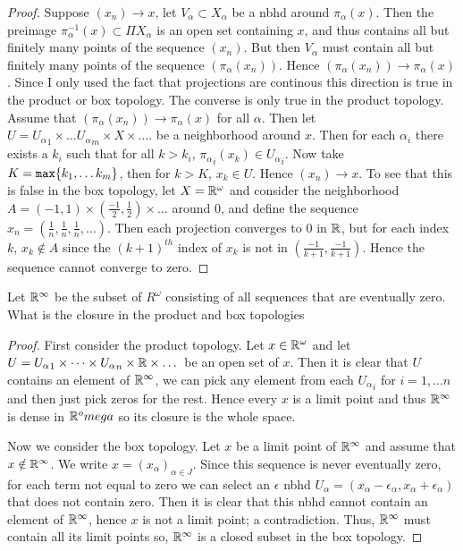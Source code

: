     \begin{proof}
        Suppose $(x_n) \rightarrow x$, let $V_\alpha \subset X_\alpha$ be a nbhd around $\pi_\alpha(x)$. Then the preimage $\pi_\alpha^{-1}(x) \subset \Pi X_\alpha$ is an open set containing $x$, and thus contains all but finitely many points 
        of the sequence $(x_n)$. But then $V_\alpha$ must contain all but finitely many points of the sequence $(\pi_\alpha(x_n))$. Hence $(\pi_\alpha(x_n)) \rightarrow \pi_\alpha(x)$. Since I only used the fact that projections are continous 
        this direction is true in the product or box topology. The converse is only true in the product topology. Assume that $(\pi_\alpha(x_n)) \rightarrow \pi_\alpha(x)$ for all $\alpha$. Then let $U = {U_\alpha}_1 \times \dots {U_\alpha}_m \times X \times \dots$. 
        be a neighborhood around $x$. Then for each $\alpha_i$ there exists a $k_i$ such that for all $k > k_i$, ${\pi_\alpha}_i(x_k) \in {U_\alpha}_i$. Now take $K = {\tt max}\{k_1, \dots k_m\}$, then for $k > K$, 
        $x_k \in U$. Hence $(x_n) \rightarrow x$. To see that this is false in the box topology, let $X = \mathbb{R}^\omega$ and consider the neighborhood $A = (-1, 1) \times (\frac{-1}{2}, \frac{1}{2}) \times \dots$ around $0$, and define the sequence 
        $x_n = (\frac{1}{n}, \frac{1}{n}, \frac{1}{n}, \dots)$. Then each projection converges to $0$ in $\mathbb{R}$, but for each index $k$, $x_k \notin A$ since the $(k+1)^{th}$ index of $x_k$ is not in $(\frac{-1}{k+1}, \frac{-1}{k+1})$. Hence the sequence cannot 
        converge to zero. 


    \end{proof}


    \question 
    Let $\mathbb{R}^\infty$ be the subset of $R^\omega$ consisting of all sequences that are eventually zero. What is the closure in the product and box topologies

    \begin{proof}
        First consider the product topology. Let $x \in \mathbb{R}^\omega$ and let $U = {U_\alpha}_1 \times \dots \times {U_\alpha}_n \times \mathbb{R} \times \dots$ be an open set 
        of $x$. Then it is clear that $U$ contains an element of $\mathbb{R}^\infty$, we can pick any element from each ${U_\alpha}_i$ for $i = 1, \dots n$ and then just pick zeros for the rest. 
        Hence every $x$ is a limit point and thus $\mathbb{R}^\infty $ is dense in $\mathbb{R}^omega$ so its closure is the whole space. 


        Now we consider the box topology. Let $x$ be a limit point of $\mathbb{R}^\infty$ and assume that $x \notin \mathbb{R}^\infty$. We write $x = (x_\alpha)_{\alpha \in J}$. Since this sequence is never eventually zero, 
        for each term not equal to zero we can select an $\epsilon$ nbhd $U_\alpha = (x_\alpha - \epsilon_\alpha, x_\alpha + \epsilon_\alpha)$ that does not contain zero. 
        Then it is clear that this nbhd cannot contain an element of $\mathbb{R}^\infty$, hence $x$ is not a limit point; a contradiction. Thus, $\mathbb{R}^\infty$ must contain all its limit points so, $\mathbb{R}^\infty$ is a closed subset in the box topology. 
    \end{proof}


